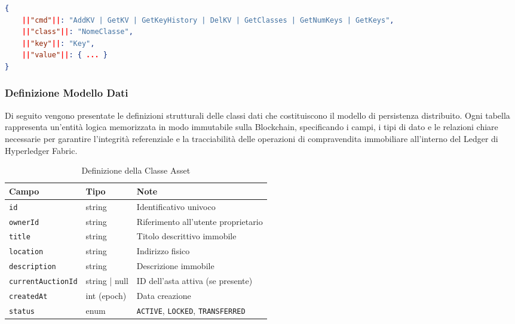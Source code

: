 \begin{lstlisting}[language=json, caption={Envelope di richiesta alle API base}]
{
    ||"cmd"||: "AddKV | GetKV | GetKeyHistory | DelKV | GetClasses | GetNumKeys | GetKeys",
    ||"class"||: "NomeClasse",
    ||"key"||: "Key",
    ||"value"||: { ... }
}
\end{lstlisting}

\subsubsection{Definizione Modello Dati}

Di seguito vengono presentate le definizioni strutturali delle classi dati che costituiscono il modello di persistenza distribuito. Ogni tabella rappresenta un'entità logica memorizzata in modo immutabile sulla Blockchain, specificando i campi, i tipi di dato e le relazioni chiare necessarie per garantire l'integrità referenziale e la tracciabilità delle operazioni di compravendita immobiliare all'interno del Ledger di Hyperledger Fabric.

\renewcommand{\arraystretch}{1.2} %
\begin{table}[h!]
    \centering
    \begin{tabular}{@{}llp{6cm}@{}}
        \toprule
        \textbf{Campo} & \textbf{Tipo} & \textbf{Note} \\
        \midrule
        \texttt{id} & string & Identificativo univoco \\
        \texttt{ownerId} & string & Riferimento all'utente proprietario \\
        \texttt{title} & string & Titolo descrittivo immobile \\
        \texttt{location} & string & Indirizzo fisico \\
        \texttt{description} & string & Descrizione immobile \\
        \texttt{currentAuctionId} & string | null & ID dell'asta attiva (se presente) \\
        \texttt{createdAt} & int (epoch) & Data creazione \\
        \texttt{status} & enum & \texttt{ACTIVE}, \texttt{LOCKED}, \texttt{TRANSFERRED} \\
        \bottomrule
    \end{tabular}
    \caption{Definizione della Classe Asset}
\end{table}

